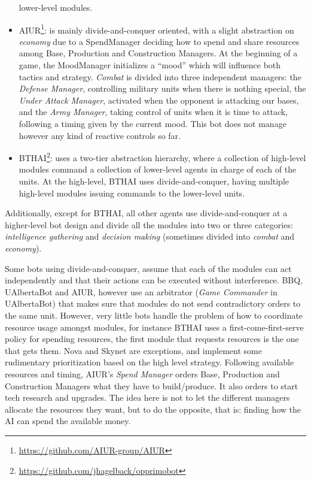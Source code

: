 \documentclass{llncs}
\begin{document}
\begin{itemize}
  lower-level modules.
\item  AIUR\footnote{\url{https://github.com/AIUR-group/AIUR}}:  is
  mainly divide-and-conquer oriented,
  with a  slight abstraction on  {\em economy} due to a  SpendManager deciding
  how  to  spend  and  share  resources  among  Base,  Production  and
  Construction Managers.  At the beginning of a  game, the MoodManager
  initializes  a  ``mood''  which  will  influence  both  tactics  and
  strategy. {\em Combat} is divided into three  independent managers: the
  {\em  Defense Manager},  controlling  military units  when there  is
  nothing special, the {\em  Under Attack Manager}, activated when the
  opponent is attacking our bases,  and the {\em Army Manager}, taking
  control of units when it is time to attack, following a timing given
  by the  current mood. This bot  does not manage however  any kind of
  reactive controls so far.
\item  BTHAI\footnote{\url{https://github.com/jhagelback/opprimobot}}:  uses  a
  two-tier  abstraction hierarchy,  where a  collection  of high-level
  modules command a collection of lower-level agents in charge of each
  of  the units.  At  the high-level,  BTHAI uses  divide-and-conquer,
  having   multiple  high-level  modules   issuing  commands   to  the
  lower-level units.
\end{itemize}

Additionally, except for BTHAI, all other agents use divide-and-conquer at a higher-level bot design and divide all the modules into two or three categories: {\em intelligence gathering} and {\em decision making} (sometimes divided into {\em combat} and {\em economy}).

Some bots  using divide-and-conquer, assume  that each of  the modules
can act independently  and that their actions can  be executed without
interference.  BBQ,  UAlbertaBot and  AIUR, however use  an arbitrator
({\em Game Commander} in UAlbertaBot) that makes sure that modules do
not send contradictory orders to  the same unit.  However, very little
bots handle  the problem of  how to coordinate resource  usage amongst
modules, for  instance BTHAI uses a  first-come-first-serve policy for
spending resources,  the first module  that requests resources  is the
one that gets them. Nova and Skynet are exceptions, and implement some
rudimentary prioritization based on the high level strategy. Following
available  resources and  timing,  AIUR's {\em  Spend Manager}  orders
Base,  Production   and  Construction  Managers  what   they  have  to
build/produce. It also orders to start tech research and upgrades. The
idea here is not to let the different managers allocate the resources they want, but to do the opposite, that is: finding how the AI can
spend the available money.
\end{document}
